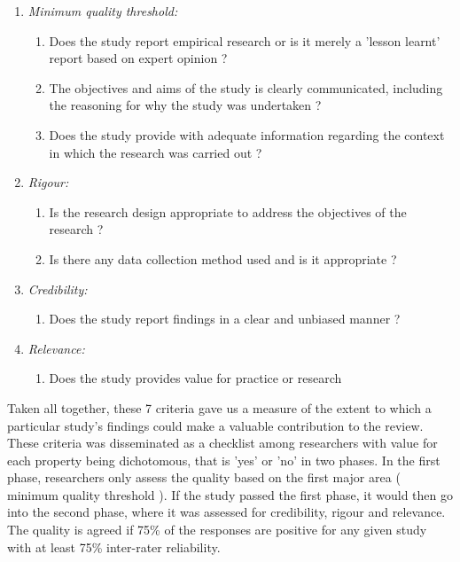 \documentclass[review]{elsarticle}
\begin{document}
\begin{enumerate}
    \item \emph{Minimum quality threshold:} 
    \begin{enumerate}
        \item Does the study report empirical research or is it merely a 'lesson learnt' report based on expert opinion ?
        \item The objectives and aims of the study is clearly communicated, including the reasoning for why the study was undertaken ? 
        \item Does the study provide with adequate information regarding the context in which the research was carried out ?
    \end{enumerate}
    \item \emph{Rigour:}
    \begin{enumerate}
        \item Is the research design appropriate to address the objectives of the research ?
        \item Is there any data collection method used and is it appropriate ?
    \end{enumerate}
    \item \emph{Credibility:}
      \begin{enumerate}
        \item Does the study report findings in a clear and unbiased manner ? 
     \end{enumerate}
    \item \emph{Relevance:}
    \begin{enumerate}
        \item Does the study provides value for practice or research 
     \end{enumerate}
\end{enumerate}

Taken all together, these 7 criteria gave us a measure of the extent to which a particular study's findings could make a valuable contribution to the review. These criteria was disseminated as a checklist among researchers with value for each property being dichotomous, that is 'yes' or 'no' in two phases. In the first phase, researchers only assess the quality based on the first major area ( minimum quality threshold ). If the study passed the first phase, it would then go into the second phase, where it was assessed for credibility, rigour and relevance. The quality is agreed if 75\% of the responses are positive for any given study with at least 75\% inter-rater reliability. 
\end{document}
